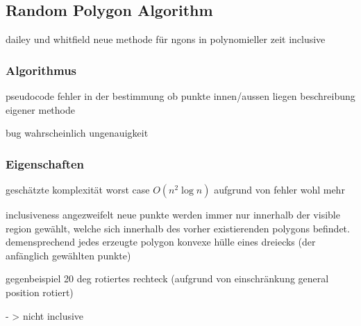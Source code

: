 \subsection{Random Polygon Algorithm} %
\label{sub:random_polygon_algorithm}
		dailey und whitfield neue methode für ngons
			in polynomieller zeit
			inclusive

	\subsubsection{Algorithmus} %
	\label{ssub:algorithmus}

		pseudocode
			fehler in der bestimmung ob punkte innen/aussen liegen
			beschreibung eigener methode

		bug
			wahrscheinlich ungenauigkeit
		
	

	\subsubsection{Eigenschaften} %
	\label{ssub:eigenschaften}

		geschätzte komplexität
			worst case $ O(n^2  \log n)$
			aufgrund von fehler wohl mehr


		inclusiveness
			angezweifelt
			neue punkte werden immer nur innerhalb der visible region gewählt, welche sich innerhalb des vorher existierenden polygons befindet. demensprechend jedes erzeugte polygon konvexe hülle eines dreiecks (der anfänglich gewählten punkte)

			gegenbeispiel 20 deg rotiertes rechteck (aufgrund von einschränkung general position rotiert)

			- > nicht inclusive


